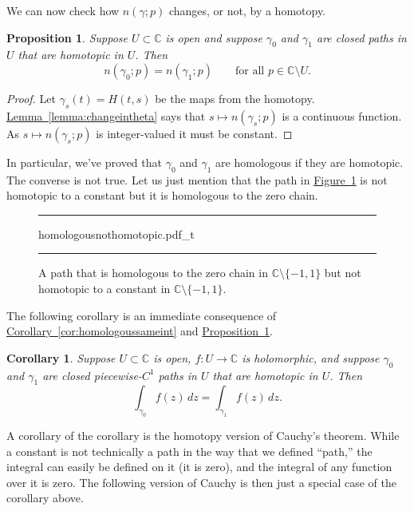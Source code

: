 \documentclass[12pt,openany]{book}
\newcommand{\C}{{\mathbb{C}}}
\newcommand{\myquote}[1]{``#1''}
\theoremstyle{plain}
\newtheorem{prop}[thm]{Proposition}
\newtheorem{cor}[thm]{Corollary}
\theoremstyle{remark}
\theoremstyle{definition}
\newenvironment{myfig}{%
\begin{figure}[h!t]
\noindent\rule{\textwidth}{0.5pt}\vspace{12pt}\par\centering}%
{\par\noindent\rule{\textwidth}{0.5pt}
\end{figure}}
\theoremstyle{exercise}
\theoremstyle{example}
\newcommand{\figureref}[1]{\hyperref[#1]{Figure~\ref*{#1}}}
\newcommand{\propref}[1]{\hyperref[#1]{Proposition~\ref*{#1}}}
\newcommand{\lemmaref}[1]{\hyperref[#1]{Lemma~\ref*{#1}}}
\newcommand{\corref}[1]{\hyperref[#1]{Corollary~\ref*{#1}}}
\begin{document}
We can now check how $n(\gamma;p)$ changes, or not, by a homotopy.

\begin{prop} \label{prop:homotopicmeanshomologous}
Suppose $U \subset \C$ is open and suppose $\gamma_0$ and $\gamma_1$ are closed
paths in $U$ that are homotopic in $U$.  Then
\begin{equation*}
n(\gamma_0;p) = n(\gamma_1;p) \qquad \text{for all } p \in \C \setminus U .
\end{equation*}
\end{prop}

\begin{proof}
Let $\gamma_s(t) = H(t,s)$ be the maps from the homotopy.
\lemmaref{lemma:changeintheta} says that $s \mapsto n(\gamma_s;p)$ is a
continuous function.  As $s \mapsto n(\gamma_s;p)$ is integer-valued it must
be constant.
\end{proof}

In particular, we've proved that $\gamma_0$ and $\gamma_1$ are homologous if
they are homotopic.  The converse is not true.  Let us just mention that 
the path in \figureref{fig:homologousnothomotopic} 
is not homotopic to a constant but it is homologous to the zero chain.

\begin{myfig}
{homologousnothomotopic.pdf_t}
\caption{A path that is homologous to the zero chain in $\C \setminus \{
-1,1\}$ but not homotopic to a constant in
$\C \setminus \{ -1,1 \}$.\label{fig:homologousnothomotopic}}
\end{myfig}

The following corollary is an immediate consequence
of \corref{cor:homologoussameint} and
\propref{prop:homotopicmeanshomologous}.

\begin{cor}
Suppose $U \subset \C$ is open, $f \colon U \to \C$ is holomorphic,
and suppose $\gamma_0$ and $\gamma_1$ are closed
piecewise-$C^1$ paths in $U$ that are homotopic in $U$.  Then
\begin{equation*}
\int_{\gamma_0} f(z) \, dz = \int_{\gamma_1} f(z) \, dz .
\end{equation*}
\end{cor}

A corollary of the corollary is the homotopy version of Cauchy's theorem.
While a constant is not technically a path in the way that we defined
\myquote{path,} the integral can easily be defined on it (it is zero),
and the integral of any function over it is zero.
The following version of Cauchy
is then just a special case of the corollary above.
\end{document}
